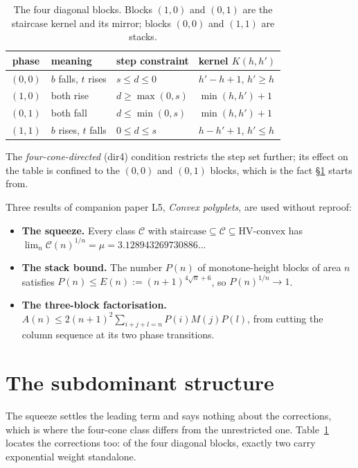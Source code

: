 \documentclass[11pt]{article}
\begin{document}
\begin{table}[H]
\centering\small
\begin{tabular}{c l l l}
\toprule
phase & meaning & step constraint & kernel $K(h,h')$ \\
\midrule
$(0,0)$ & $b$ falls, $t$ rises & $s \le d \le 0$ & $h'-h+1$, \; $h' \ge h$ \\
$(1,0)$ & both rise & $d \ge \max(0,s)$ & $\min(h,h')+1$ \\
$(0,1)$ & both fall & $d \le \min(0,s)$ & $\min(h,h')+1$ \\
$(1,1)$ & $b$ rises, $t$ falls & $0 \le d \le s$ & $h-h'+1$, \; $h' \le h$ \\
\bottomrule
\end{tabular}
\caption{The four diagonal blocks. Blocks $(1,0)$ and $(0,1)$ are the staircase
kernel and its mirror; blocks $(0,0)$ and $(1,1)$ are stacks.}
\label{tab:blocks}
\end{table}

The \emph{four-cone-directed} (dir4) condition restricts the step set further;
its effect on the table is confined to the $(0,0)$ and $(0,1)$ blocks, which is
the fact \S\ref{sec:subdominant} starts from.

Three results of companion paper L5, \emph{Convex polyplets}, are used
without reproof:

\begin{itemize}
\item \textbf{The squeeze.} Every class $\mathcal C$ with
  $\text{staircase} \subseteq \mathcal C \subseteq \text{HV-convex}$ has
  $\lim_n \mathcal C(n)^{1/n} = \mu = 3.128943269730886\dots$
\item \textbf{The stack bound.} The number $P(n)$ of monotone-height blocks of
  area $n$ satisfies $P(n) \le E(n) := (n{+}1)^{4\sqrt n + 6}$, so
  $P(n)^{1/n} \to 1$.
\item \textbf{The three-block factorisation.}
  $A(n) \le 2(n{+}1)^2\sum_{i+j+l=n}P(i)M(j)P(l)$, from cutting the column
  sequence at its two phase transitions.
\end{itemize}

\section{The subdominant structure}
\label{sec:subdominant}

The squeeze settles the leading term and says nothing about the corrections,
which is where the four-cone class differs from the unrestricted one.
Table~\ref{tab:blocks} locates the corrections too: of the four diagonal blocks,
exactly two carry exponential weight standalone.
\end{document}

